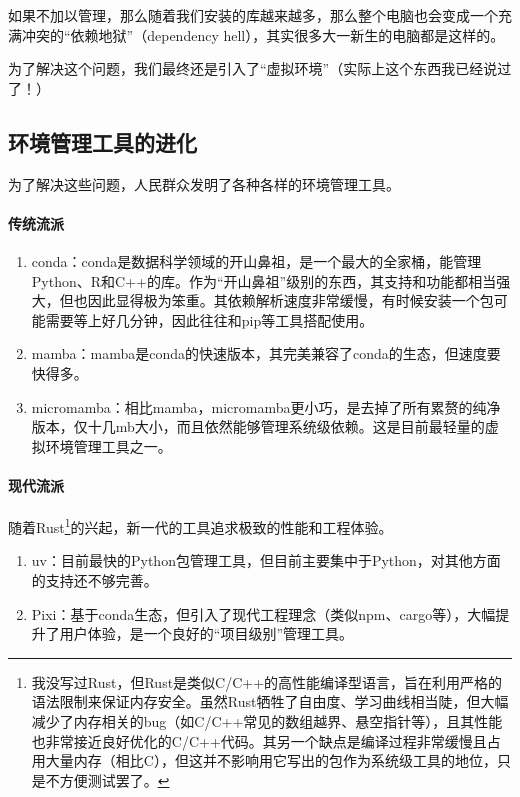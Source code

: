 如果不加以管理，那么随着我们安装的库越来越多，那么整个电脑也会变成一个充满冲突的“依赖地狱”（dependency hell），其实很多大一新生的电脑都是这样的。

为了解决这个问题，我们最终还是引入了“虚拟环境”（实际上这个东西我已经说过了！）

\subsection{环境管理工具的进化}

为了解决这些问题，人民群众发明了各种各样的环境管理工具。

\paragraph{传统流派}
\begin{enumerate}
    \item conda：conda是数据科学领域的开山鼻祖，是一个最大的全家桶，能管理Python、R和C++的库。作为“开山鼻祖”级别的东西，其支持和功能都相当强大，但也因此显得极为笨重。其依赖解析速度非常缓慢，有时候安装一个包可能需要等上好几分钟，因此往往和pip等工具搭配使用。
    \item mamba：mamba是conda的快速版本，其完美兼容了conda的生态，但速度要快得多。
    \item micromamba：相比mamba，micromamba更小巧，是去掉了所有累赘的纯净版本，仅十几mb大小，而且依然能够管理系统级依赖。这是目前最轻量的虚拟环境管理工具之一。
\end{enumerate}

\paragraph{现代流派} 随着Rust\footnote{我没写过Rust，但Rust是类似C/C++的高性能编译型语言，旨在利用严格的语法限制来保证内存安全。虽然Rust牺牲了自由度、学习曲线相当陡，但大幅减少了内存相关的bug（如C/C++常见的数组越界、悬空指针等），且其性能也非常接近良好优化的C/C++代码。其另一个缺点是编译过程非常缓慢且占用大量内存（相比C），但这并不影响用它写出的包作为系统级工具的地位，只是不方便测试罢了。}的兴起，新一代的工具追求极致的性能和工程体验。
\begin{enumerate}
    \item uv：目前最快的Python包管理工具，但目前主要集中于Python，对其他方面的支持还不够完善。
    \item Pixi：基于conda生态，但引入了现代工程理念（类似npm、cargo等），大幅提升了用户体验，是一个良好的“项目级别”管理工具。
\end{enumerate}

